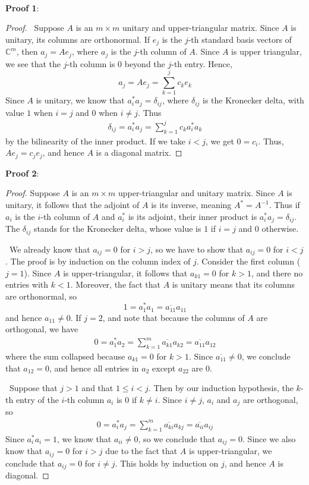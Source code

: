 \documentclass[12pt]{article}
\newenvironment{sol}[1][Solution]{\begin{trivlist}
		\item[\hskip \labelsep {\bfseries #1:}]}{\end{trivlist}}
\begin{document}
\begin{sol}
	\
	
	\textbf{Proof 1}:
	\begin{proof}	
		\
		Suppose $A$ is an $m\times m$ unitary and upper-triangular matrix. Since $A$ is unitary,
		its columns are orthonormal. If $e_j$ is the $j$-th standard basis vectors of $\mathbb{C}^m$,
		then $a_j=Ae_j$, where $a_j$ is the $j$-th column of $A$. Since $A$ is upper triangular, we
		see that the $j$-th column is 0 beyond the $j$-th entry. Hence,
		\[
		a_j = Ae_j = \sum_{k=1}^{j}c_ke_k
		\]
		Since $A$ is unitary, we know that $a_i^*a_j=\delta_{ij}$, where $\delta_{ij}$ is the Kronecker
		delta, with value $1$ when $i=j$ and $0$ when $i\neq j$. Thus
		\begin{align*}
			\delta_{ij} = a_i^*a_j = \sum_{k=1}^{j}c_k a_i^*a_k
		\end{align*}
		by the bilinearity of the inner product. If we take $i<j$, we get $0=c_i$. Thus,
		$Ae_j=c_je_j$, and hence $A$ is a diagonal matrix.
	\end{proof}
	\textbf{Proof 2}:
	\begin{proof}
			
		Suppose $A$ is an $m\times m$ upper-triangular and unitary matrix. Since $A$ is unitary,
		it follows that the adjoint of $A$ is its inverse, meaning $A^*=A^{-1}$. Thus if $a_i$ is
		the $i$-th column of $A$ and $a_i^*$ is its adjoint, their inner product is $a_i^* a_j=\delta_{ij}$.
		The $\delta_{ij}$ stands for the Kronecker delta, whose value is $1$ if $i=j$ and $0$ otherwise.
		
		\
		We already know that $a_{ij}=0$ for $i>j$, so we have to show that $a_{ij}=0$ for $i<j$.
		The proof is by induction on the column index of $j$. Consider the first column ($j=1$). Since
		$A$ is upper-triangular, it follows that $a_{k1}=0$ for $k>1$, and there no entries with $k<1$.
		Moreover, the fact that $A$ is unitary means that its columns are orthonormal, so
		\[
		1 = a_1^*a_1=\overline{a_{11}}a_{11}
		\]
		and hence $a_{11}\neq 0$. If $j=2$, and note that because the columns of $A$ are orthogonal, we have
		\begin{align*}
			0 = a_1^*a_2 = \sum_{k=1}^{m} \overline{a_{k1}} a_{k2} = \overline{a_{11}} a_{12}
		\end{align*}
		where the sum collapsed because $a_{k1}=0$ for $k>1$. Since $\overline{a_{11}}\neq 0$, we conclude
		that $a_{12}=0$, and hence all entries in $a_2$ except $a_{22}$ are 0.
		
		\
		Suppose that $j>1$ and that $1\leq i<j$. Then by our induction hypothesis, the $k$-th
		entry of the $i$-th column $a_i$ is 0 if $k\neq i$. Since $i\neq j$, $a_i$ and $a_j$
		are orthogonal, so
		\begin{align*}
			0 = a_i^*a_j=\sum_{k=1}^{m}\overline{a_{ki}}a_{kj}=\overline{a_{ii}}a_{ij}
		\end{align*}
		Since $a_i^*a_i=1$, we know that $a_{ii}\neq 0$, so we conclude that $a_{ij}=0$. Since
		we also know that $a_{ij}=0$ for $i>j$ due to the fact that $A$ is upper-triangular, we
		conclude that $a_{ij}=0$ for $i\neq j$. This holds by induction on $j$, and hence $A$
		is diagonal.
	\end{proof}
\end{sol}
\end{document}
